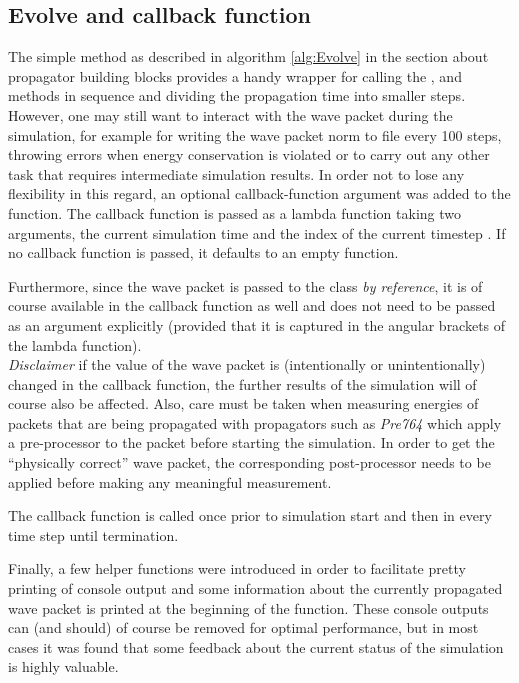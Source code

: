 \subsection{Evolve and callback function}
\label{subsec:callback}
%
The simple  method as described in algorithm \ref{alg:Evolve} in the section about propagator building blocks provides a handy wrapper for calling the ,  and  methods in sequence and dividing the propagation time into smaller steps. \\
%
However, one may still want to interact with the wave packet during the simulation, for example for writing the wave packet norm to file every 100 steps, throwing errors when energy conservation is violated or to carry out any other task that requires intermediate simulation results.
In order not to lose any flexibility in this regard, an optional callback-function argument was added to the  function.
The callback function is passed as a lambda function taking two arguments, the current simulation time  and the index of the current timestep .
If no callback function is passed, it defaults to an empty function.
\par\medskip
%
Furthermore, since the wave packet is passed to the  class \emph{by reference}, it is of course available in the callback function as well and does not need to be passed as an argument explicitly (provided that it is captured in the angular brackets \proc{[]} of the lambda function). \\
\emph{Disclaimer} if the value of the wave packet is (intentionally or unintentionally) changed in the callback function, the further results of the simulation will of course also be affected.
Also, care must be taken when measuring energies of packets that are being propagated with propagators such as \emph{Pre764} which apply a pre-processor to the packet before starting the simulation.
In order to get the ``physically correct'' wave packet, the corresponding post-processor needs to be applied before making any meaningful measurement.
\par\medskip
%
The callback function is called once prior to simulation start and then in every time step until termination.
\par\medskip
%
Finally, a few helper functions were introduced in order to facilitate pretty printing of console output and some information about the currently propagated wave packet is printed at the beginning of the  function.
These console outputs can (and should) of course be removed for optimal performance, but in most cases it was found that some feedback about the current status of the simulation is highly valuable.


